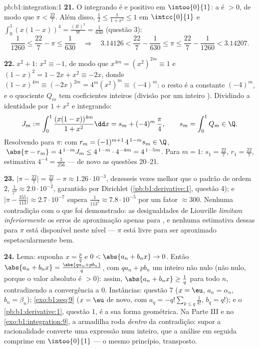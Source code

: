 \begin{solution}{pb:b1:integration:1}
\textbf{21.} O integrando é  e positivo em
$\intoo{0}{1}$: a  é $> 0$, de modo que $\pi < \frac{22}{7}$.
Além disso, $\frac12 \leq \frac{1}{1+x^2} \leq 1$ em
$\intcc{0}{1}$ e $\int_0^1 (x(1-x))^4 = \frac{(4!)^2}{9!} =
\frac{1}{630}$ (questão 3):
\[
\frac{1}{1260} \leq \frac{22}{7} - \pi \leq \frac{1}{630}
\quad\Longrightarrow\quad
3.14126 < \frac{22}{7} - \frac{1}{630} \leq \pi \leq
\frac{22}{7} - \frac{1}{1260} < 3.14207 .
\]

\textbf{22.}  $x^2 + 1$: $x^2 \equiv -1$, de modo que $x^{4m} =
(x^2)^{2m} \equiv 1$ e $(1 - x)^2 = 1 - 2x + x^2 \equiv -2x$,
donde $(1-x)^{4m} \equiv (-2x)^{2m} = 4^m (x^2)^m \equiv
(-4)^m$: o resto é a constante $(-4)^m$, e o
quociente $Q_m$ tem coeficientes inteiros (divisão por um 
inteiro ). Dividindo a identidade por $1 + x^2$ e
integrando:
\[
J_m := \int_0^1 \frac{(x(1-x))^{4m}}{1+x^2}\dd x
= s_m + (-4)^m\,\frac{\pi}{4},
\qquad s_m = \int_0^1 Q_m \in \Q .
\]
Resolvendo para $\pi$: com $r_m = (-1)^{m+1}\,4^{\,1-m} s_m \in
\Q$, $\;\abs{\pi - r_m} = 4^{\,1-m} J_m \leq
4^{\,1-m}\cdot4^{-4m} = 4^{\,1-5m}$. Para $m = 1$: $s_1 =
\frac{22}{7}$, $r_1 = \frac{22}{7}$, estimativa $4^{-4} =
\frac{1}{256}$ --- de novo as questões 20--21.

\textbf{23.} $\bigl|\pi - \frac{22}{7}\bigr| = \frac{22}{7} -
\pi \approx 1.26\cdot10^{-3}$, dezesseis vezes melhor que o
padrão de ordem $2$, $\frac{1}{7^2} \approx 2.0\cdot10^{-2}$,
garantido por Dirichlet (\cref{pb:b1:derivative:1}, questão 4);
e $\bigl|\pi - \frac{355}{113}\bigr| \approx 2.7\cdot10^{-7}$
supera $\frac{1}{113^2} \approx 7.8\cdot10^{-5}$ por um fator
$\approx 300$. Nenhuma contradição com o que foi demonstrado: as
desigualdades de Liouville \emph{limitam inferiormente} os erros de
aproximação apenas para , e nenhuma estimativa
dessas para $\pi$ está disponível neste nível --- $\pi$ está livre
para ser aproximado espetacularmente bem.

\textbf{24.} Lema: suponha $x = \frac pq$ e $0 < \abs{a_n +
b_n x} \to 0$. Então $\abs{a_n + b_n x} = \frac{\abs{q a_n + p
b_n}}{q}$, com $q a_n + p b_n$ um inteiro não nulo (não nulo,
porque o valor absoluto é $> 0$): assim, $\abs{a_n + b_n x}
\geq \frac1q$ para todo $n$, contradizendo a convergência a
$0$. Instâncias: questão 7 ($x = \eu$, $a_n = \alpha_n$, $b_n =
\beta_n$); \cref{exo:b1:seq:9} ($x = \eu$ de novo, com $a_q =
-q!\sum_{k \leq q}\frac{1}{k!}$, $b_q = q!$); e o
\cref{pb:b1:derivative:1}, questão 1, é a sua forma geométrica.
Na Parte III e no \cref{exo:b1:integration:9}, a armadilha roda
\emph{dentro} da contradição: supor a racionalidade converte
uma expressão num inteiro, que a análise em seguida comprime
em $\intoo{0}{1}$ --- o mesmo princípio, transposto.


\end{solution}
